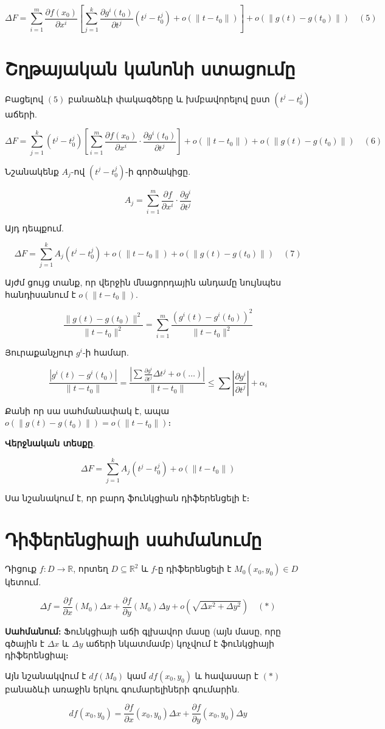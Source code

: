 \documentclass[12pt, a4paper]{article}
\begin{document}
$$\Delta F = \sum_{i=1}^{m} \frac{\partial f(x_0)}{\partial x^i} \left[ \sum_{j=1}^{k} \frac{\partial g^i(t_0)}{\partial t^j} (t^j - t_0^j) + o(\|t - t_0\|) \right] + o(\|g(t) - g(t_0)\|) \quad (5)$$

\section{Շղթայական կանոնի ստացումը}

Բացելով $(5)$ բանաձևի փակագծերը և խմբավորելով ըստ $(t^j - t_0^j)$ աճերի.

$$\Delta F = \sum_{j=1}^{k} (t^j - t_0^j) \left[ \sum_{i=1}^{m} \frac{\partial f(x_0)}{\partial x^i} \cdot \frac{\partial g^i(t_0)}{\partial t^j} \right] + o(\|t - t_0\|) + o(\|g(t) - g(t_0)\|) \quad (6)$$

Նշանակենք $A_j$-ով $(t^j - t_0^j)$-ի գործակիցը.

$$A_j = \sum_{i=1}^{m} \frac{\partial f}{\partial x^i} \cdot \frac{\partial g^i}{\partial t^j}$$

Այդ դեպքում.

$$\Delta F = \sum_{j=1}^{k} A_j (t^j - t_0^j) + o(\|t - t_0\|) + o(\|g(t) - g(t_0)\|) \quad (7)$$

Այժմ ցույց տանք, որ վերջին մնացորդային անդամը նույնպես հանդիսանում է $o(\|t - t_0\|)$.

$$\frac{\|g(t) - g(t_0)\|^2}{\|t - t_0\|^2} = \sum_{i=1}^{m} \frac{(g^i(t) - g^i(t_0))^2}{\|t - t_0\|^2}$$

Յուրաքանչյուր $g^i$-ի համար.

$$\frac{|g^i(t) - g^i(t_0)|}{\|t - t_0\|} = \frac{|\sum \frac{\partial g^i}{\partial t^j} \Delta t^j + o(\dots)|}{\|t - t_0\|} \leq \sum \left| \frac{\partial g^i}{\partial t^j} \right| + \alpha_i$$

Քանի որ սա սահմանափակ է, ապա $o(\|g(t) - g(t_0)\|) = o(\|t - t_0\|)$։

\textbf{Վերջնական տեսքը}.

$$\Delta F = \sum_{j=1}^{k} A_j (t^j - t_0^j) + o(\|t - t_0\|)$$

Սա նշանակում է, որ բարդ ֆունկցիան դիֆերենցելի է։

\section{Դիֆերենցիալի սահմանումը}

Դիցուք $f: D \to \mathbb{R}$, որտեղ $D \subseteq \mathbb{R}^2$ և $f$-ը դիֆերենցելի է $M_0(x_0, y_0) \in D$ կետում.

$$\Delta f = \frac{\partial f}{\partial x}(M_0) \Delta x + \frac{\partial f}{\partial y}(M_0) \Delta y + o(\sqrt{\Delta x^2 + \Delta y^2}) \quad (*)$$

\textbf{Սահմանում:} Ֆունկցիայի աճի գլխավոր մասը (այն մասը, որը գծային է $\Delta x$ և $\Delta y$ աճերի նկատմամբ) կոչվում է ֆունկցիայի դիֆերենցիալ։

Այն նշանակվում է $df(M_0)$ կամ $df(x_0, y_0)$ և հավասար է $(*)$ բանաձևի առաջին երկու գումարելիների գումարին.

$$df(x_0, y_0) = \frac{\partial f}{\partial x}(x_0, y_0) \Delta x + \frac{\partial f}{\partial y}(x_0, y_0) \Delta y$$
\end{document}
